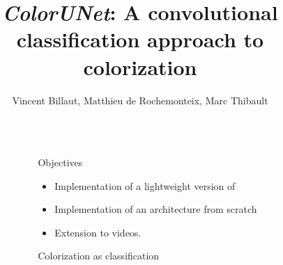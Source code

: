 \documentclass[final]{beamer}
\title{\textit{ColorUNet}: A convolutional classification approach to colorization} %
\author{Vincent Billaut, Matthieu de Rochemonteix, Marc Thibault} %
\institute{CS231n Final Project, 03/12/2018} %
\newlength{\sepwid}
\newlength{\onecolwid}
\begin{document}
\small
{} %

\setlength{\belowcaptionskip}{2ex} %
\setlength\belowdisplayshortskip{2ex} %

\begin{frame}[t] %

\begin{columns}[t] %

\begin{column}{\sepwid}\end{column} %

\begin{column}{\onecolwid} %



\begin{alertblock}{Objectives}

\begin{itemize}
\item Implementation of a lightweight version of \cite{zhang2016colorful}
\item Implementation of an architecture from scratch
\item Extension to videos.
\end{itemize}

\end{alertblock}


\begin{block}{Colorization as classification}


\end{block}
\end{column}
\end{columns}
\end{frame}
\end{document}
